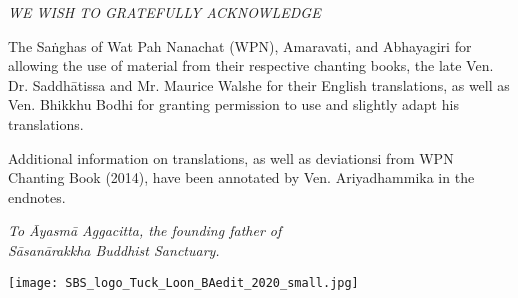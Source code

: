 \cleartorecto
\thispagestyle{empty}

\mbox{}\vfill

{\centering\itshape
WE WISH TO GRATEFULLY ACKNOWLEDGE
}

The Saṅghas of Wat Pah Nanachat (WPN), Amaravati, and Abhayagiri for allowing the use of material from their respective chanting books, the late Ven. Dr. Saddhātissa and Mr. Maurice Walshe for their English translations, as well as Ven. Bhikkhu Bodhi for granting permission to use and slightly adapt his translations.

Additional information on translations, as well as deviationsi from WPN Chanting Book (2014), have been annotated by Ven. Ariyadhammika in the endnotes.

\bigskip

{\centering\itshape
To Āyasmā Aggacitta, the founding father of\\
Sāsanārakkha Buddhist Sanctuary.

\bigskip

\texttt{[image: SBS\_logo\_Tuck\_Loon\_BAedit\_2020\_small.jpg]}
\par}

\vfill\mbox{}

